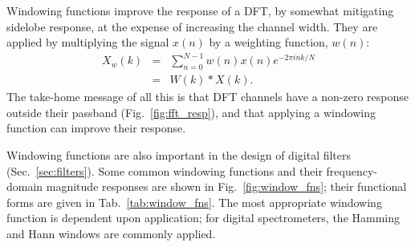 \documentclass{ws-rv961x669}
\begin{document}
Windowing functions\citet{SvenGade1987} improve the response of a DFT, by somewhat mitigating sidelobe response, at the expense of increasing the channel width. They are applied by multiplying the signal $x(n)$ by a weighting function, $w(n)$:
\begin{eqnarray}
X_w(k) & = & \sum_{n=0}^{N-1}w(n)x(n)e^{-2\pi ink/N} \\
       & = & W(k)*X(k).
\end{eqnarray}
The take-home message of all this is that DFT channels have a non-zero response outside their passband (Fig.~\ref{fig:fft_resp}), and that applying a windowing function can improve their response. 

Windowing functions are also important in the design of digital filters (Sec.~\ref{sec:filters}). Some common windowing functions and their frequency-domain magnitude responses are shown in Fig.~\ref{fig:window_fns}; their functional forms are given in Tab.~\ref{tab:window_fns}. The most appropriate windowing function is dependent upon application; for digital spectrometers, the Hamming and Hann windows are commonly applied.



\end{document}
